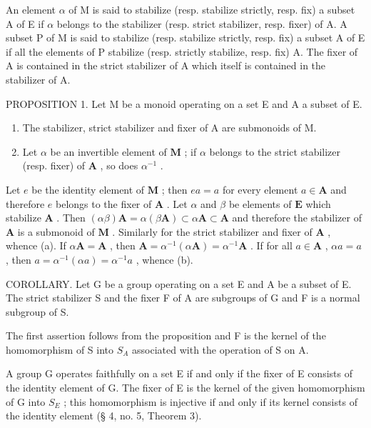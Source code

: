 An element \(\alpha\) of M is said to stabilize (resp. stabilize strictly, resp. fix) a subset A of E if \(\alpha\) belongs to the stabilizer (resp. strict stabilizer, resp. fixer) of A. A subset P of M is said to stabilize (resp. stabilize strictly, resp. fix) a subset A of E if all the elements of P stabilize (resp. strictly stabilize, resp. fix) A. The fixer of A is contained in the strict stabilizer of A which itself is contained in the stabilizer of A.

PROPOSITION 1. Let M be a monoid operating on a set E and A a subset of E.

\begin{enumerate}
\def\labelenumi{(\alph{enumi})}
\item
  The stabilizer, strict stabilizer and fixer of A are submonoids of M.
\item
  Let \(\alpha\) be an invertible element of \(\mathbf{M}\) ; if \(\alpha\) belongs to the strict stabilizer (resp. fixer) of \(\mathbf{A}\) , so does \(\alpha^{-1}\) .
\end{enumerate}

Let \(e\) be the identity element of \(\mathbf{M}\) ; then \(ea = a\) for every element \(a \in \mathbf{A}\) and therefore \(e\) belongs to the fixer of \(\mathbf{A}\) . Let \(\alpha\) and \(\beta\) be elements of \(\mathbf{E}\) which stabilize \(\mathbf{A}\) . Then \((\alpha\beta)\mathbf{A} = \alpha(\beta\mathbf{A}) \subset \alpha\mathbf{A} \subset \mathbf{A}\) and therefore the stabilizer of \(\mathbf{A}\) is a submonoid of \(\mathbf{M}\) . Similarly for the strict stabilizer and fixer of \(\mathbf{A}\) , whence (a). If \(\alpha\mathbf{A} = \mathbf{A}\) , then \(\mathbf{A} = \alpha^{-1}(\alpha\mathbf{A}) = \alpha^{-1}\mathbf{A}\) . If for all \(a \in \mathbf{A}\) , \(\alpha a = a\) , then \(a = \alpha^{-1}(\alpha a) = \alpha^{-1}a\) , whence (b).

COROLLARY. Let G be a group operating on a set E and A be a subset of E. The strict stabilizer S and the fixer F of A are subgroups of G and F is a normal subgroup of S.

The first assertion follows from the proposition and F is the kernel of the homomorphism of S into \(S_{A}\) associated with the operation of S on A.

A group G operates faithfully on a set E if and only if the fixer of E consists of the identity element of G. The fixer of E is the kernel of the given homomorphism of G into \(S_{E}\) ; this homomorphism is injective if and only if its kernel consists of the identity element (§ 4, no. 5, Theorem 3).

